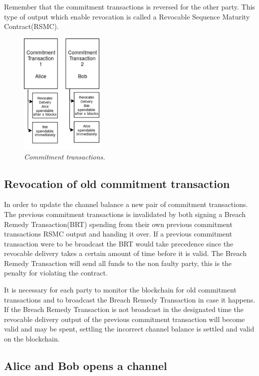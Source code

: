 Remember that the commitment transactions is reversed for the other party. This type of output which enable revocation is called a Revocable Sequence Maturity Contract(RSMC).

\begin{figure}[!htb]
	
	\centering
	\includegraphics[width=4cm]{RSMC.png}
	\caption{\textit{Commitment transactions. 
	}}
	\label{fig:merkle:tree}
	
\end{figure}

\subsection{Revocation of old commitment transaction}

In order to update the channel balance a new pair of commitment transactions. The previous commitment transactions is invalidated by both signing a Breach Remedy Transaction(BRT) spending from their own previous commitment transactions RSMC output and handing it over. If a previous commitment transaction were to be broadcast the BRT would take precedence since the revocable delivery takes a certain amount of time before it is valid. The Breach Remedy Transaction will send all funds to the non faulty party, this is the penalty for violating the contract.

It is necessary for each party to monitor the blockchain for old commitment transactions and to broadcast the Breach Remedy Transaction in case it happens. If the Breach Remedy Transaction is not broadcast in the designated time the revocable delivery output of the previous commitment transaction will become valid and may be spent, settling the incorrect channel balance is settled and valid on the blockchain.

\subsection{Alice and Bob opens a channel}

